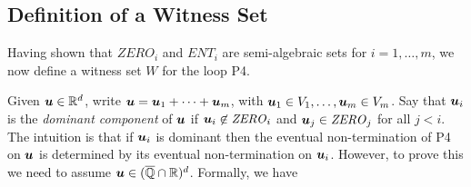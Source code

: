 \subsection{Definition of a Witness Set}
Having shown that $\mathit{ZERO}_i$ and $\mathit{ENT}_i$ are
semi-algebraic sets for $i=1,\ldots,m$, we now define a witness set
$W$ for the loop \textsf{P4}.

Given $\boldsymbol{u} \in \mathbb{R}^{d}$, write $\boldsymbol{u}=
\boldsymbol{u}_1+\cdots+\boldsymbol{u}_m$, with $\boldsymbol{u}_1 \in
V_1,\ldots,\boldsymbol{u}_m\in V_m$.  Say that $\boldsymbol{u}_i$ is
the \emph{dominant component} of $\boldsymbol{u}$ if
$\boldsymbol{u}_i\not\in \mathit{ZERO}_i$ and
$\boldsymbol{u}_j\in\mathit{ZERO}_j$ for all $j<i$.  The intuition is
that if $\boldsymbol{u}_i$ is dominant then the eventual
non-termination of \textsf{P4} on $\boldsymbol{u}$ is determined by
its eventual non-termination on $\boldsymbol{u}_i$.  However, to prove
this we need to assume $\boldsymbol{u}\in (\overline{\mathbb{Q}}\cap\mathbb{R})^{d}$.
Formally, we have

